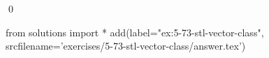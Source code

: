 
\begin{ex}
  \label{ex:5-73-stl-vector-class}
  
  \qed
\end{ex}
\begin{python0}
from solutions import *
add(label="ex:5-73-stl-vector-class",
    srcfilename='exercises/5-73-stl-vector-class/answer.tex')
\end{python0}
